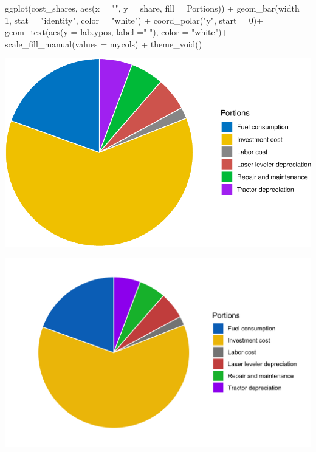 \documentclass[
]{article}
\newenvironment{Shaded}{\begin{snugshade}}{\end{snugshade}}
\newcommand{\AttributeTok}[1]{\textcolor[rgb]{0.77,0.63,0.00}{#1}}
\newcommand{\DecValTok}[1]{\textcolor[rgb]{0.00,0.00,0.81}{#1}}
\newcommand{\FunctionTok}[1]{\textcolor[rgb]{0.00,0.00,0.00}{#1}}
\newcommand{\NormalTok}[1]{#1}
\newcommand{\SpecialCharTok}[1]{\textcolor[rgb]{0.00,0.00,0.00}{#1}}
\newcommand{\StringTok}[1]{\textcolor[rgb]{0.31,0.60,0.02}{#1}}
\begin{document}
\begin{Shaded}
\begin{Highlighting}[]
\FunctionTok{ggplot}\NormalTok{(cost\_shares, }\FunctionTok{aes}\NormalTok{(}\AttributeTok{x =} \StringTok{""}\NormalTok{, }\AttributeTok{y =}\NormalTok{ share, }\AttributeTok{fill =}\NormalTok{ Portions)) }\SpecialCharTok{+}
  \FunctionTok{geom\_bar}\NormalTok{(}\AttributeTok{width =} \DecValTok{1}\NormalTok{, }\AttributeTok{stat =} \StringTok{"identity"}\NormalTok{, }\AttributeTok{color =} \StringTok{"white"}\NormalTok{) }\SpecialCharTok{+}
  \FunctionTok{coord\_polar}\NormalTok{(}\StringTok{"y"}\NormalTok{, }\AttributeTok{start =} \DecValTok{0}\NormalTok{)}\SpecialCharTok{+}
  \FunctionTok{geom\_text}\NormalTok{(}\FunctionTok{aes}\NormalTok{(}\AttributeTok{y =}\NormalTok{ lab.ypos, }\AttributeTok{label =}\StringTok{" "}\NormalTok{), }\AttributeTok{color =} \StringTok{"white"}\NormalTok{)}\SpecialCharTok{+}
  \FunctionTok{scale\_fill\_manual}\NormalTok{(}\AttributeTok{values =}\NormalTok{ mycols) }\SpecialCharTok{+}
  \FunctionTok{theme\_void}\NormalTok{()}
\end{Highlighting}
\end{Shaded}

\includegraphics{Laser_leveling_simulation_files/figure-latex/cost-benefit-analysis-1.pdf}

\includegraphics{images/Cost_portions.png}
\end{document}
